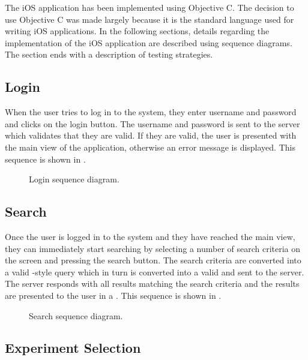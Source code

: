 The iOS application has been implemented using Objective C. The decision to use Objective C was made largely because it is the standard language used for writing iOS applications. 
In the following sections, details regarding the implementation of the iOS application are described using sequence diagrams. The section ends with a description of testing strategies.

\subsection{Login}

When the user tries to log in to the system, they enter username and password and clicks on the login button. The username and password is sent to the server which validates that they are valid. If they are valid, the user is presented with the main view of the application, otherwise an error message is displayed. This sequence is shown in  .

\begin{figure}[ht]
\caption{Login sequence diagram.}
\label{fig:ios_sequence_login}
\end{figure}

\subsection{Search}

Once the user is logged in to the system and they have reached the main view, they can immediately start searching by selecting a number of search criteria on the screen and pressing the search button. The search criteria are converted into a valid -style query which in turn is converted into a valid  and sent to the server. The server responds with all results matching the search criteria and the results are presented to the user in a . This sequence is shown in .

\begin{figure}[ht]
\caption{Search sequence diagram.}
\label{fig:ios_sequence_search}
\end{figure}

\subsection{Experiment Selection}

